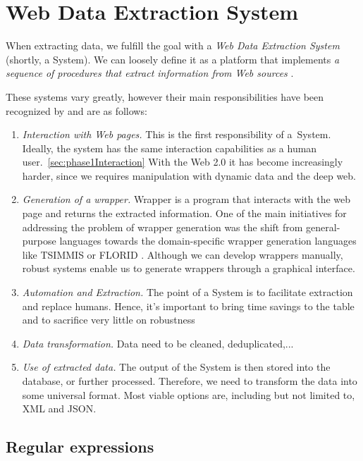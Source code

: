 \section{Web Data Extraction System}
When extracting data, we fulfill the goal with a \textit{Web Data Extraction System} (shortly, a System).
We can loosely define it as a platform that implements \textit{a sequence of procedures that extract information from Web sources} \cite{laender2002brief}.

These systems vary greatly, however their main responsibilities have been recognized by \cite{ferrara2014web} and are as follows:
\begin{enumerate}
    \item \textit{Interaction with Web pages.} This is the first responsibility of a~System. Ideally, the system has the same interaction capabilities as a human user.~\ref{sec:phase1Interaction}
    With the Web 2.0 it has become increasingly harder, since we requires manipulation with dynamic data and the deep web.
    \item \textit{Generation of a wrapper.} Wrapper is a program that interacts with the web page and returns the extracted information. One of the main initiatives for addressing the problem of wrapper generation was the shift from general-purpose languages towards the domain-specific wrapper generation languages like TSIMMIS \cite{hammer1997TSIMMIS} or FLORID \cite{ludascher1998FLORID}. Although we can develop wrappers manually, robust systems enable us to generate wrappers through a graphical interface.
    
    \item \textit{Automation and Extraction.} The point of a System is to facilitate extraction and replace humans. Hence, it's important to bring time savings to the table and to sacrifice very little on robustness
    \item \textit{Data transformation.} Data need to be cleaned, deduplicated,...
    \item \textit{Use of extracted data.} The output of the System is then stored into the database, or further processed. Therefore, we need to transform the data into some universal format. Most viable options are, including but not limited to, XML and JSON. 
\end{enumerate}


\subsection{Regular expressions}


